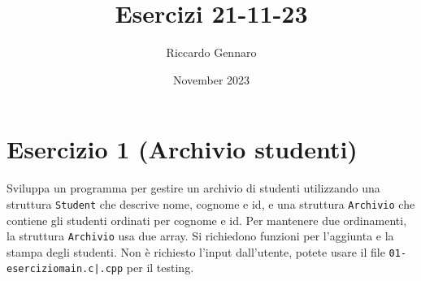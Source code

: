 \documentclass{article}
\title{Esercizi 21-11-23}
\author{Riccardo Gennaro}
\date{November 2023}
\begin{document}
    \maketitle

    \section*{Esercizio 1 (Archivio studenti)}

    
    Sviluppa un programma per gestire un archivio di studenti utilizzando una struttura \texttt{Student} che descrive nome, cognome e id, e una struttura \texttt{Archivio} che contiene gli studenti ordinati per cognome e id. Per mantenere due ordinamenti, la struttura \texttt{Archivio} usa due array.
    Si richiedono funzioni per l'aggiunta e la stampa degli studenti.
    Non è richiesto l'input dall'utente, potete usare il file \texttt{01-esercizio\textunderscore main.c|.cpp} per il testing.
\end{document}
